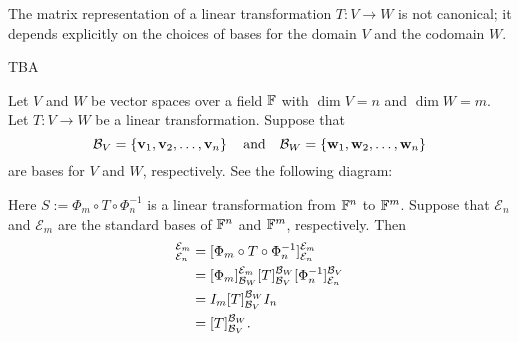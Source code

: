 \documentclass[11pt,openany]{article}
\renewcommand{\vec}[1]{\mathbf{#1}}
\begin{document}
\vspace{20pt}
\begin{remark*}
The matrix representation of a linear transformation $T:V\to W$ is not canonical; it depends explicitly on the choices of bases for the domain $V$ and the codomain $W$.
\end{remark*}
\newpage
\begin{observation}
	TBA
\end{observation}\vspace{10pt}
\iffalse
\begin{observation}
Let $V$ and $W$ be vector spaces over a field $\mathbb{F}$ with $\dim V=n$ and $\dim W=m$. Let $T:V\to W$ be a linear transformation. Suppose that \[
\basis_V=\set{\vec{v}_1,\vec{v}_2,\dots,\vec{v}_n}\quad\text{and}\quad\basis_W=\set{\vec{w}_1,\vec{w}_2,\dots,\vec{w}_n}
\] are bases for $V$ and $W$, respectively. See the following diagram:
\begin{center}
\end{center} Here $S:=\Phi_m\circ T\circ \Phi_n^{-1}$ is a linear transformation from $\mathbb{F}^n$ to $\mathbb{F}^m$. Suppose that $\mathcal{E}_n$ and $\mathcal{E}_m$ are the standard bases of $\mathbb{F}^n$ and $\mathbb{F}^m$, respectively. Then \begin{align*}
[S]_{\mathcal{E}_n}^{\mathcal{E}_m} &= [\Phi_m\circ T\circ \Phi_n^{-1}]_{\mathcal{E}_n}^{\mathcal{E}_m}\\
&=[\Phi_m]_{\basis_W}^{\mathcal{E}_m}[T]_{\basis_V}^{\basis_W}[\Phi_n^{-1}]_{\mathcal{E}_n}^{\basis_V}\\
&=I_m[T]_{\basis_V}^{\basis_W}I_n\\
&=[T]_{\basis_V}^{\basis_W}.
\end{align*}
\end{observation}
\end{document}
